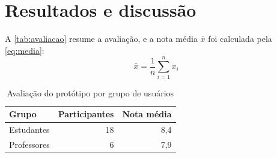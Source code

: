 \chapter{Resultados e discussão}\label{cap:resultados}

A \autoref{tab:avaliacao} resume a avaliação, e a nota média $\bar{x}$ foi
calculada pela \autoref{eq:media}:
\begin{equation}\label{eq:media}
  \bar{x} = \frac{1}{n} \sum_{i=1}^{n} x_i
\end{equation}

\begin{table}[htbp]
\begin{tabela}{\caption{Avaliação do protótipo por grupo de usuários}%
               \label{tab:avaliacao}}%
              {\elaboracaopropria{}}
  \begin{tabular}{lrr}
    \toprule
    \textbf{Grupo} & \textbf{Participantes} & \textbf{Nota média} \\
    \midrule
    Estudantes  & 18 & 8,4 \\
    Professores &  6 & 7,9 \\
    \bottomrule
  \end{tabular}
\end{tabela}
\end{table}
